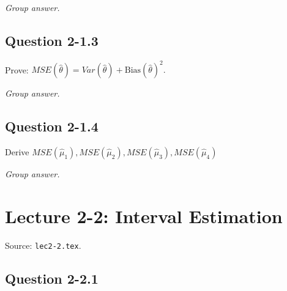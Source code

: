 \documentclass[11pt,letterpaper]{article}
\newenvironment{groupanswer}
  {\par\smallskip\noindent\textit{Group answer.}\par\nopagebreak\smallskip}
  {\par\medskip}
\begin{document}
\begin{groupanswer}
\vspace{\baselineskip}
\end{groupanswer}


\subsection*{Question 2-1.3}

\label{q:lec2-1-3}


Prove: $MSE(\hat{\theta}) = Var(\hat{\theta}) + \text{Bias}(\hat{\theta})^2.$


\begin{groupanswer}
\vspace{\baselineskip}
\end{groupanswer}


\subsection*{Question 2-1.4}

\label{q:lec2-1-4}


Derive $MSE(\hat\mu_{1}), MSE(\hat\mu_{2}), MSE(\hat\mu_{3}), MSE(\hat\mu_{4})$


\begin{groupanswer}
\vspace{\baselineskip}
\end{groupanswer}

\clearpage

\section*{Lecture 2-2: Interval Estimation}

{\small Source: \texttt{lec2-2.tex}.}


\subsection*{Question 2-2.1}
\end{document}
